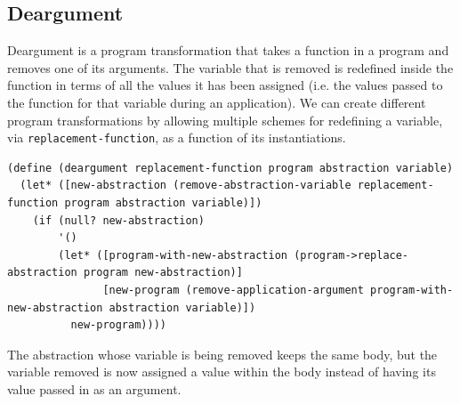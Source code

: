 \documentclass[a4paper,10pt]{article}
\begin{document}
\subsection{Deargument}
Deargument is a program transformation that takes a function in a program and removes one of its arguments.  The variable that is removed is redefined inside the function in terms of all the values it has been assigned (i.e. the values passed to the function for that variable during an application).  We can create different program transformations by allowing multiple schemes for redefining a variable, via \texttt{replacement-function},  as a function of its instantiations.  
\begin{lstlisting}[frame=trBL]
(define (deargument replacement-function program abstraction variable)
  (let* ([new-abstraction (remove-abstraction-variable replacement-function program abstraction variable)])
    (if (null? new-abstraction)
        '()
        (let* ([program-with-new-abstraction (program->replace-abstraction program new-abstraction)]
               [new-program (remove-application-argument program-with-new-abstraction abstraction variable)])
          new-program))))
\end{lstlisting}
The abstraction whose variable is being removed keeps the same body, but the variable removed is now assigned a value  within the body instead of having its value passed in as an argument.
\end{document}
